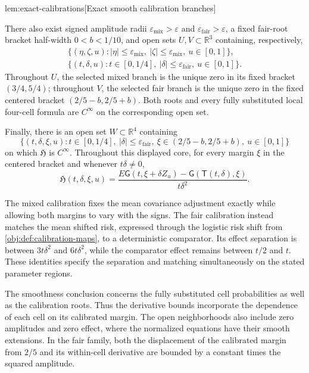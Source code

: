 \begin{lemmav}{lem:exact-calibrations}[Exact smooth calibration branches]
\begin{itemize}
There also exist signed amplitude radii
\(\varepsilon_{\mathrm{mix}}>\varepsilon\) and
\(\varepsilon_{\mathrm{fair}}>\varepsilon\), a fixed fair-root bracket half-width
\(0<b<1/10\), and open sets \(U,V\subset\mathbb R^3\) containing, respectively,
\[
\begin{gathered}
\{(\eta,\zeta,u):|\eta|\le\varepsilon_{\mathrm{mix}},
                       \ |\zeta|\le\varepsilon_{\mathrm{mix}},\ u\in[0,1]\},\\
\{(t,\delta,u):t\in[0,1/4],\
                  |\delta|\le\varepsilon_{\mathrm{fair}},\ u\in[0,1]\}.
\end{gathered}
\]
Throughout \(U\), the selected mixed branch is the unique zero in its fixed bracket \((3/4,5/4)\); throughout \(V\), the selected fair branch is the unique zero in the fixed centered bracket \((2/5-b,2/5+b)\). Both roots and every fully substituted local four-cell formula are \(C^\infty\) on the corresponding open set.

Finally, there is an open set \(W\subset\mathbb R^4\) containing
\[
\{(t,\delta,\xi,u):t\in[0,1/4],\
 |\delta|\le\varepsilon_{\mathrm{fair}},\
 \xi\in(2/5-b,2/5+b),\ u\in[0,1]\}
\]
on which \(\mathfrak H\) is \(C^\infty\). Throughout this displayed core, for every margin \(\xi\) in the centered bracket and whenever \(t\delta\ne0\),
\[
\mathfrak H(t,\delta,\xi,u)
=\frac{E\mathsf G(t,\xi+\delta Z_u)-\mathsf G(\mathsf T(t,\delta),\xi)}
       {t\delta^2}.
\]
\end{itemize}
\end{lemmav}

The mixed calibration fixes the mean covariance adjustment exactly while allowing both margins to vary with the signs. The fair calibration instead matches the mean shifted risk, expressed through the logistic risk shift  from \cref{obj:def:calibration-maps}, to a deterministic comparator. Its effect separation is between \(3t\delta^2\) and \(6t\delta^2\), while the comparator effect remains between \(t/2\) and \(t\). These identities specify the separation and matching simultaneously on the stated parameter regions.

The smoothness conclusion concerns the fully substituted cell probabilities as well as the calibration roots. Thus the derivative bounds incorporate the dependence of each cell on its calibrated margin. The open neighborhoods also include zero amplitudes and zero effect, where the normalized equations have their smooth extensions. In the fair family, both the displacement of the calibrated margin from \(2/5\) and its within-cell derivative are bounded by a constant times the squared amplitude.

